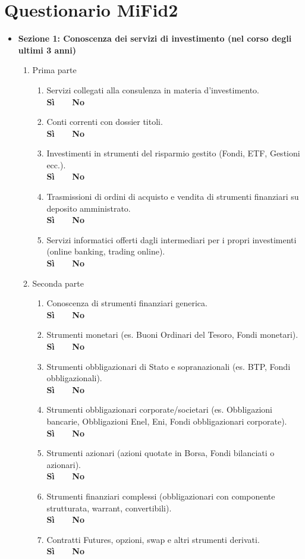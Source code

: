 \def \boolans {\\ \textbf{Sì \ \ \ No}} 

\appendix 

\section{Questionario MiFid2}

\begin{itemize}

    \item \textbf{Sezione 1: Conoscenza dei servizi di investimento (nel corso degli ultimi 3 anni)}

    \begin{enumerate}

        \item Prima parte

        \begin{enumerate}[label*=\arabic*.]
            \item Servizi collegati alla consulenza in materia d'investimento.
            \boolans
            \item Conti correnti con dossier titoli.
            \boolans
            \item Investimenti in strumenti del risparmio gestito (Fondi, ETF, Gestioni ecc.).
            \boolans
            \item Trasmissioni di ordini di acquisto e vendita di strumenti finanziari su deposito amministrato.
            \boolans
            \item Servizi informatici offerti dagli intermediari per i propri investimenti (online banking, trading online).
            \boolans
        \end{enumerate}

        \item Seconda parte

        \begin{enumerate}[label*=\arabic*.]
            \item Conoscenza di strumenti finanziari generica.
            \boolans
            \item Strumenti monetari (es. Buoni Ordinari del Tesoro, Fondi monetari).
            \boolans
            \item Strumenti obbligazionari di Stato e sopranazionali (es. BTP, Fondi obbligazionali).
            \boolans
            \item Strumenti obbligazionari corporate/societari (es. Obbligazioni bancarie, Obbligazioni Enel, Eni, Fondi obbligazionari corporate).
            \boolans
            \item Strumenti azionari (azioni quotate in Borsa, Fondi bilanciati o azionari).
            \boolans
            \item Strumenti finanziari complessi (obbligazionari con componente strutturata, warrant, convertibili).
            \boolans
            \item Contratti Futures, opzioni, swap e altri strumenti derivati.
            \boolans
        \end{enumerate}


\end{enumerate}
\end{itemize}
